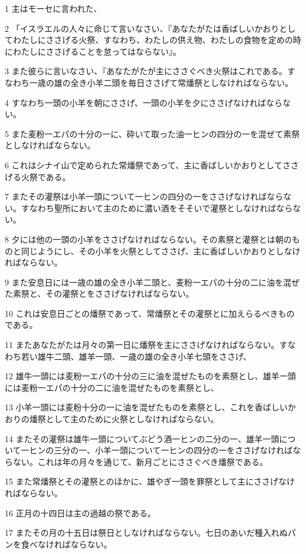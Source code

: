 \par 1 主はモーセに言われた、
\par 2 「イスラエルの人々に命じて言いなさい、『あなたがたは香ばしいかおりとしてわたしにささげる火祭、すなわち、わたしの供え物、わたしの食物を定めの時にわたしにささげることを怠ってはならない』。
\par 3 また彼らに言いなさい、『あなたがたが主にささぐべき火祭はこれである。すなわち一歳の雄の全き小羊二頭を毎日ささげて常燔祭としなければならない。
\par 4 すなわち一頭の小羊を朝にささげ、一頭の小羊を夕にささげなければならない。
\par 5 また麦粉一エパの十分の一に、砕いて取った油一ヒンの四分の一を混ぜて素祭としなければならない。
\par 6 これはシナイ山で定められた常燔祭であって、主に香ばしいかおりとしてささげる火祭である。
\par 7 またその灌祭は小羊一頭について一ヒンの四分の一をささげなければならない。すなわち聖所において主のために濃い酒をそそいで灌祭としなければならない。
\par 8 夕には他の一頭の小羊をささげなければならない。その素祭と灌祭とは朝のものと同じようにし、その小羊を火祭としてささげ、主に香ばしいかおりとしなければならない。
\par 9 また安息日には一歳の雄の全き小羊二頭と、麦粉一エパの十分の二に油を混ぜた素祭と、その灌祭とをささげなければならない。
\par 10 これは安息日ごとの燔祭であって、常燔祭とその灌祭とに加えらるべきものである。
\par 11 またあなたがたは月々の第一日に燔祭を主にささげなければならない。すなわち若い雄牛二頭、雄羊一頭、一歳の雄の全き小羊七頭をささげ、
\par 12 雄牛一頭には麦粉一エパの十分の三に油を混ぜたものを素祭とし、雄羊一頭には麦粉一エパの十分の二に油を混ぜたものを素祭とし、
\par 13 小羊一頭には麦粉十分の一に油を混ぜたものを素祭とし、これを香ばしいかおりの燔祭として主のために火祭としなければならない。
\par 14 またその灌祭は雄牛一頭についてぶどう酒一ヒンの二分の一、雄羊一頭について一ヒンの三分の一、小羊一頭について一ヒンの四分の一をささげなければならない。これは年の月々を通じて、新月ごとにささぐべき燔祭である。
\par 15 また常燔祭とその灌祭とのほかに、雄やぎ一頭を罪祭として主にささげなければならない。
\par 16 正月の十四日は主の過越の祭である。
\par 17 またその月の十五日は祭日としなければならない。七日のあいだ種入れぬパンを食べなければならない。
